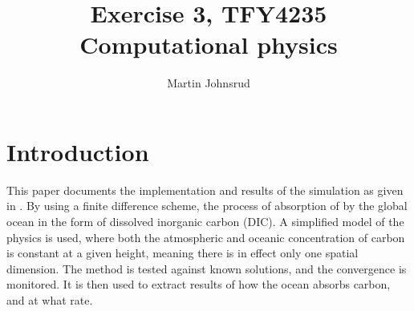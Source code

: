 \documentclass{article}
\title{Exercise 3, TFY4235 Computational physics}
\author{Martin Johnsrud}
\date{}
\begin{document}
    \maketitle
    \section*{Introduction}
        This paper documents the implementation and results of the simulation as given in \cite{exercise}. By using a finite difference scheme, the process of absorption of  by the global ocean in the form of dissolved inorganic carbon (DIC). A simplified model of the physics is used, where both the atmospheric and oceanic concentration of carbon is constant at a given height, meaning there is in effect only one spatial dimension. The method is tested against known solutions, and the convergence is monitored. It is then used to extract results of how the ocean absorbs carbon, and at what rate.
\end{document}

